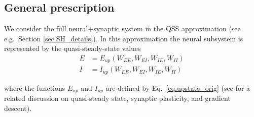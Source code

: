 \documentclass[twocolumn]{article}
\newcommand{\EE}{\mathit{EE}}
\newcommand{\EI}{\mathit{EI}}
\newcommand{\IE}{\mathit{IE}}
\newcommand{\II}{\mathit{II}}
\newcommand{\up}{\mathit{up}}
\begin{document}
\subsection{General prescription}

We consider the full neural+synaptic system in the QSS approximation (see e.g.\ Section \ref{sec.SH_details}). In this approximation the neural subsystem is represented by the quasi-steady-state values
\begin{equation}
\begin{aligned}
E & = E_{\up}(W_{\EE},W_{\EI},W_{\IE},W_{\II}) \\
I & = I_{\up}(W_{\EE},W_{\EI},W_{\IE},W_{\II})
\label{eq.LF_EIup}
\end{aligned}
\end{equation}

\noindent where the functions $E_{\up}$ and $I_{\up}$ are defined by Eq.\ \ref{eq.upstate_orig} (see \cite{Mackwood2020} for a related discussion on quasi-steady state, synaptic plasticity, and gradient descent).
\end{document}
